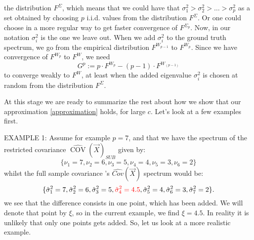\documentclass[12pt]{amsart}
\theoremstyle{definition}
\DeclareMathOperator{\Cov}{COV}
\numberwithin{equation}{section}
\numberwithin{equation}{section}
\theoremstyle{remark}
\numberwithin{equation}{section}
\begin{document}
the distribution $F^{\Sigma}$, which means that we could have that
$\sigma^2_1>\sigma^2_2>\ldots>\sigma^2_p$
as a set obtained by choosing $p$ i.i.d. values from the distribution $F^\Sigma$.
Or one could choose in a more regular way to get faster convergence of $F^{\Sigma_p}$. Now, in our notation $\sigma^2_i$ is the one we leave out. When we add $\sigma^2_i$ to the ground truth spectrum,
we go from the empirical distribution $F^{W_{p-1}}$ to $F^{W_p}$.
Since we have convergence of $F^{W_p}$ to $F^W$, we need
\begin{equation}
\label{distribution_function}
G^p:=p\cdot F^{W_p}-(p-1)\cdot F^{W_(p-1)}
\end{equation} to converge
weakly to
$F^W$, at least when the added eigenvalue $\sigma_i^2$ is chosen at random
from the distribution $F^\Sigma$.

At this stage we are ready to summarize the rest about how we show that our approximation \ref{approximation} holds, for large $c$. Let's look at a few examples first.

EXAMPLE 1:
Assume for example $p=7$, and that we have the spectrum of the restricted covariance $\hat{\Cov}(\vec{X})_{SUB}$
given by:
$$\{\nu_1=7,\nu_2=6,\nu_3=5,\nu_4=4,\nu_5=3,\nu_6=2\}
$$
whilst the full sample covariance 's  $\hat{Cov}(\vec{X})$ spectrum would be:
$$\{\hat{\sigma}^2_1=7,\hat{\sigma}^2_2=6,\hat{\sigma}^2_3=5,{\color{red}\hat{\sigma}^2_4=4.5},\hat{\sigma}^2_5=4,\hat{\sigma}^2_6=3,\hat{\sigma}^2_7=2\}.$$
we see that the difference consists in one point, which has been added. We will denote that point by $\xi$, so in the current example,
we find $\xi=4.5$. In reality it is unlikely that only one points gets added. So, let us look at a more realistic example.
\end{document}
